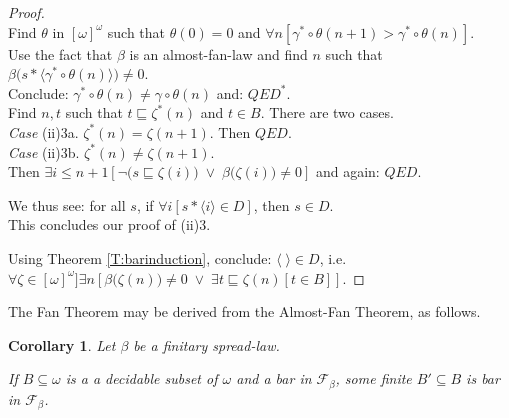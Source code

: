 \documentclass[a4paper]{amsart}
\theoremstyle{plain}
\newtheorem{corollary}[theorem]{Corollary}
\begin{document}
\begin{proof}
\\Find $\theta$ in $[\omega]^\omega$ such that $\theta(0)=0$ and $\forall n[\gamma^\ast\circ\theta(n+1)>\gamma^\ast\circ \theta(n)]$. 
\\Use the fact that $\beta$ is an almost-fan-law and find $n$ such that $ \beta\bigl(s\ast\langle \gamma^\ast\circ\theta(n)\rangle\bigr)\neq 0$.  
\\Conclude: $\gamma^\ast\circ \theta(n)\neq \gamma\circ\theta(n)$ and:   $QED^\ast$.\\Find $n,t$ such that $t\sqsubseteq \zeta^\ast(n)$ and $t\in B$. There are two cases.\\{\it Case} (ii)3a. $\zeta^\ast(n)=\zeta(n+1)$. Then $QED$. \\ {\it Case} (ii)3b. $\zeta^\ast(n)\neq \zeta(n+1)$. \\Then $\exists i\le n+1[\neg \bigl(s\sqsubseteq \zeta(i)\bigr) \;\vee\; \beta\bigl(\zeta(i)\bigr)\neq 0]$ and again: $QED$. 
 



We thus see: for all $s$, if $\forall i[s\ast\langle i \rangle \in D]$, then $s\in D$. \\This concludes our proof of (ii)3. 

\smallskip Using Theorem \ref{T:barinduction},  conclude: $\langle\;\rangle \in D$, i.e. \\$\forall \zeta \in [\omega]^\omega]\exists n[ \beta\bigl(\zeta(n)\bigr)\neq 0 \;\vee\; \exists t\sqsubseteq \zeta(n)[t\in B]]$. 


\end{proof}

 The Fan Theorem may be derived from the Almost-Fan Theorem, as follows. 

\begin{corollary}\label{C:fan3}  Let $\beta$ be a finitary spread-law.
 
 If $B\subseteq \omega$ is a a decidable subset of $\omega$ and a  bar in $\mathcal{F}_\beta$, some finite $B'\subseteq B$ is  bar in $\mathcal{F}_\beta$. \end{corollary} 
 
\end{document}
